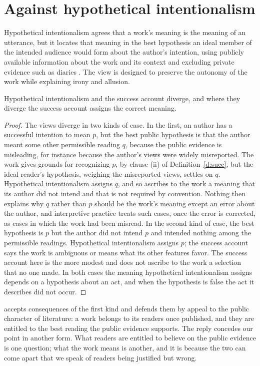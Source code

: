 \documentclass{situationist-preprint}
\begin{document}
\section{Against hypothetical intentionalism}

Hypothetical intentionalism agrees that a work's meaning is the meaning of an utterance, but it locates that meaning in the best hypothesis an ideal member of the intended audience would form about the author's intention, using publicly available information about the work and its context and excluding private evidence such as diaries \citep{Levinson1992}. The view is designed to preserve the autonomy of the work while explaining irony and allusion.

\begin{proposition}\label{p:hyp}
Hypothetical intentionalism and the success account diverge, and where they diverge the success account assigns the correct meaning.
\end{proposition}

\begin{proof}
The views diverge in two kinds of case. In the first, an author has a successful intention to mean $p$, but the best public hypothesis is that the author meant some other permissible reading $q$, because the public evidence is misleading, for instance because the author's views were widely misreported. The work gives grounds for recognizing $p$, by clause (ii) of Definition~\ref{d:succ}, but the ideal reader's hypothesis, weighing the misreported views, settles on $q$. Hypothetical intentionalism assigns $q$, and so ascribes to the work a meaning that its author did not intend and that is not required by convention. Nothing then explains why $q$ rather than $p$ should be the work's meaning except an error about the author, and interpretive practice treats such cases, once the error is corrected, as cases in which the work had been misread. In the second kind of case, the best hypothesis is $p$ but the author did not intend $p$ and intended nothing among the permissible readings. Hypothetical intentionalism assigns $p$; the success account says the work is ambiguous or means what its other features favor. The success account here is the more modest and does not ascribe to the work a selection that no one made. In both cases the meaning hypothetical intentionalism assigns depends on a hypothesis about an act, and when the hypothesis is false the act it describes did not occur.
\end{proof}

\citet{Levinson1992} accepts consequences of the first kind and defends them by appeal to the public character of literature: a work belongs to its readers once published, and they are entitled to the best reading the public evidence supports. The reply concedes our point in another form. What readers are entitled to believe on the public evidence is one question; what the work means is another, and it is because the two can come apart that we speak of readers being justified but wrong.
\end{document}
